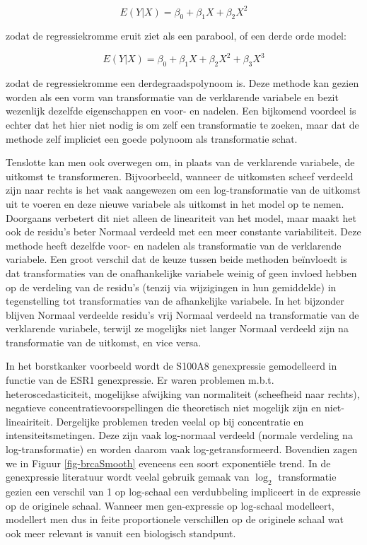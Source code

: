 \documentclass[
  dutch,
  letterpaper,
  12pt]{book}
\theoremstyle{definition}
\theoremstyle{definition}
\theoremstyle{definition}
\theoremstyle{remark}
\begin{document}
\[E(Y|X)=\beta_0+\beta_1X+\beta_2X^2\]

zodat de regressiekromme eruit ziet als een parabool, of een derde orde
model:

\[E(Y|X)=\beta_0+\beta_1X+\beta_2X^2+\beta_3X^3\]

zodat de regressiekromme een derdegraadspolynoom is. Deze methode kan
gezien worden als een vorm van transformatie van de verklarende
variabele en bezit wezenlijk dezelfde eigenschappen en voor- en nadelen.
Een bijkomend voordeel is echter dat het hier niet nodig is om zelf een
transformatie te zoeken, maar dat de methode zelf impliciet een goede
polynoom als transformatie schat.

Tenslotte kan men ook overwegen om, in plaats van de verklarende
variabele, de uitkomst te transformeren. Bijvoorbeeld, wanneer de
uitkomsten scheef verdeeld zijn naar rechts is het vaak aangewezen om
een log-transformatie van de uitkomst uit te voeren en deze nieuwe
variabele als uitkomst in het model op te nemen. Doorgaans verbetert dit
niet alleen de lineariteit van het model, maar maakt het ook de residu's
beter Normaal verdeeld met een meer constante variabiliteit. Deze
methode heeft dezelfde voor- en nadelen als transformatie van de
verklarende variabele. Een groot verschil dat de keuze tussen beide
methoden beïnvloedt is dat transformaties van de onafhankelijke
variabele weinig of geen invloed hebben op de verdeling van de residu's
(tenzij via wijzigingen in hun gemiddelde) in tegenstelling tot
transformaties van de afhankelijke variabele. In het bijzonder blijven
Normaal verdeelde residu's vrij Normaal verdeeld na transformatie van de
verklarende variabele, terwijl ze mogelijks niet langer Normaal verdeeld
zijn na transformatie van de uitkomst, en vice versa.

In het borstkanker voorbeeld wordt de S100A8 genexpressie gemodelleerd
in functie van de ESR1 genexpressie. Er waren problemen m.b.t.
heteroscedasticiteit, mogelijkse afwijking van normaliteit (scheefheid
naar rechts), negatieve concentratievoorspellingen die theoretisch niet
mogelijk zijn en niet-lineairiteit. Dergelijke problemen treden veelal
op bij concentratie en intensiteitsmetingen. Deze zijn vaak log-normaal
verdeeld (normale verdeling na log-transformatie) en worden daarom vaak
log-getransformeerd. Bovendien zagen we in Figuur \ref{fig-brcaSmooth}
eveneens een soort exponentiële trend. In de genexpressie literatuur
wordt veelal gebruik gemaak van \(\log_2\) transformatie gezien een
verschil van 1 op log-schaal een verdubbeling impliceert in de expressie
op de originele schaal. Wanneer men gen-expressie op log-schaal
modelleert, modellert men dus in feite proportionele verschillen op de
originele schaal wat ook meer relevant is vanuit een biologisch
standpunt.
\end{document}
